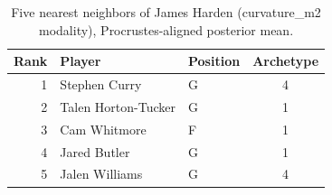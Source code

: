 \begin{table}[htbp]
  \centering\small
  \begin{tabular}{rllc}
    \toprule
    Rank & Player & Position & Archetype \\
    \midrule
    1 & Stephen Curry & G & 4 \\
    2 & Talen Horton-Tucker & G & 1 \\
    3 & Cam Whitmore & F & 1 \\
    4 & Jared Butler & G & 1 \\
    5 & Jalen Williams & G & 4 \\
    \bottomrule
  \end{tabular}
  \caption{Five nearest neighbors of James Harden (curvature_m2 modality), Procrustes-aligned posterior mean.}
  \label{tab:James_Harden_neighbors_curvature_m2}
\end{table}

